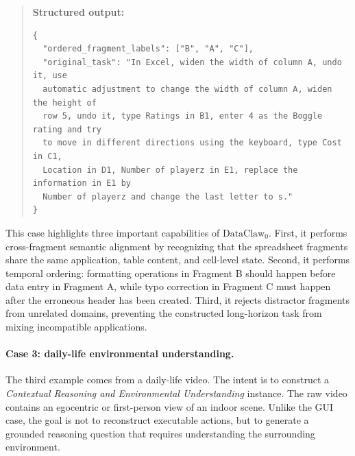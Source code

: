 \begin{quote}
\textbf{Structured output:}
\begin{verbatim}
{
  "ordered_fragment_labels": ["B", "A", "C"],
  "original_task": "In Excel, widen the width of column A, undo it, use
  automatic adjustment to change the width of column A, widen the height of
  row 5, undo it, type Ratings in B1, enter 4 as the Boggle rating and try
  to move in different directions using the keyboard, type Cost in C1,
  Location in D1, Number of playerz in E1, replace the information in E1 by
  Number of playerz and change the last letter to s."
}
\end{verbatim}
\end{quote}

This case highlights three important capabilities of $\text{DataClaw}_0$. First, it performs cross-fragment semantic alignment by recognizing that the spreadsheet fragments share the same application, table content, and cell-level state. Second, it performs temporal ordering: formatting operations in Fragment B should happen before data entry in Fragment A, while typo correction in Fragment C must happen after the erroneous header has been created. Third, it rejects distractor fragments from unrelated domains, preventing the constructed long-horizon task from mixing incompatible applications.

\paragraph{Case 3: daily-life environmental understanding.}
The third example comes from a daily-life video. The intent is to construct a \emph{Contextual Reasoning and Environmental Understanding} instance. The raw video contains an egocentric or first-person view of an indoor scene. Unlike the GUI case, the goal is not to reconstruct executable actions, but to generate a grounded reasoning question that requires understanding the surrounding environment.

